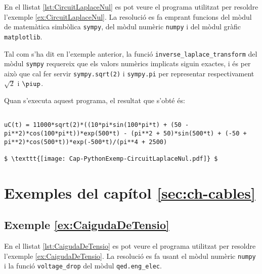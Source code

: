 En el llistat \vref{lst:CircuitLaplaceNul} es pot veure el programa utilitzat per resoldre l'exemple \vref{ex:CircuitLaplaceNul}. La resolució es fa emprant funcions del mòdul de matemàtica simbòlica \texttt{sympy}, del mòdul numèric \texttt{numpy} i del mòdul gràfic  \texttt{matplotlib}. 

Tal com s'ha dit en l'exemple anterior, la funció \texttt{inverse\_laplace\_transform} del mòdul \texttt{sympy}  requereix que els valors numèrics implicats siguin exactes, i és per això que cal fer servir \texttt{sympy.sqrt(2)} i \texttt{sympy.pi} per representar respectivament  $\sqrt{2}$ i $\piup$.




Quan s'executa aquest programa, el resultat que s'obté és:
\lstset{
	language=,
	numbers=none,
	frame=none
}
\begin{lstlisting}[mathescape=true]
	
uC(t) = 11000*sqrt(2)*((10*pi*sin(100*pi*t) + (50 - pi**2)*cos(100*pi*t))*exp(500*t) - (pi**2 + 50)*sin(500*t) + (-50 + pi**2)*cos(500*t))*exp(-500*t)/(pi**4 + 2500)

$ \texttt{[image: Cap-PythonExemp-CircuitLaplaceNul.pdf]} $
\end{lstlisting} 



\section{Exemples del capítol \ref*{sec:ch-cables}}

\hypertarget{exemple:CaigudaDeTensio}{\subsection{Exemple \ref*{ex:CaigudaDeTensio} \CaigudaDeTensio}}
En el llistat \vref{lst:CaigudaDeTensio} es pot veure el programa utilitzat per resoldre l'exemple \vref{ex:CaigudaDeTensio}. La resolució es fa usant el mòdul numèric \texttt{numpy} i  la funció \texttt{voltage\_drop} del mòdul \texttt{qed.eng\_elec}.


